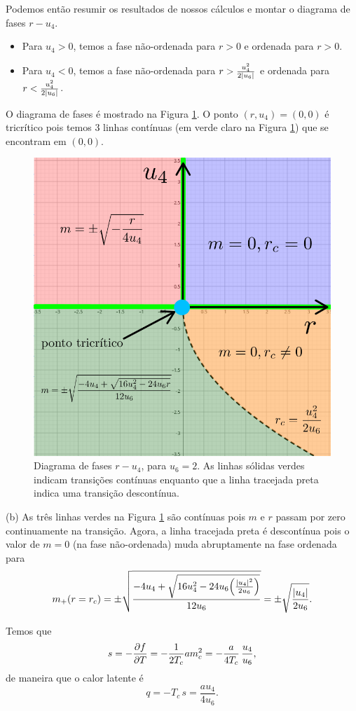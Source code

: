 \documentclass[a4paper,10pt]{article}
\begin{document}
\n

Podemos então resumir os resultados de nossos cálculos e montar o diagrama de fases $r-u_4$.
\begin{itemize}
\item Para $u_4 > 0$, temos a fase não-ordenada para $r > 0$ e ordenada para $r > 0$.
\item Para $u_4 < 0$, temos a fase não-ordenada para $r > \frac{u_4^2}{2 \abs{u_6}}$ e ordenada para $r < \frac{u_4^2}{2 \abs{u_6}}$.
\end{itemize}

O diagrama de fases é mostrado na Figura \ref{fig:phase_diag-tricrit}. O ponto $(r,u_4) = (0,0)$ é tricrítico pois temos 3 linhas contínuas (em verde claro na Figura \ref{fig:phase_diag-tricrit}) que se encontram em $(0,0)$.
\begin{figure}[H]
\centering
\includegraphics[width=0.49\linewidth]{fig/phase_diag-tricrit.png}
\caption{Diagrama de fases $r - u_4$, para $u_6 = 2$. As linhas sólidas verdes indicam transições contínuas enquanto que a linha tracejada preta indica uma transição descontínua.}
\label{fig:phase_diag-tricrit}
\end{figure}

(b) As três linhas verdes na Figura \ref{fig:phase_diag-tricrit} são contínuas pois $m$ e $r$ passam por zero continuamente na transição. Agora, a linha tracejada preta é descontínua pois o valor de $m = 0$ (na fase não-ordenada) muda abruptamente na fase ordenada para
$$
m_+(r = r_c) = \pm\sqrt{\frac{- 4 u_4 + \sqrt{16 u_4^2 - 24 u_6 \qty(\frac{\abs{u_4}^2}{2 u_6})}}{12 u_6}} = \pm\sqrt{\frac{\abs{u_4}}{2 u_6}}.
$$

\n

Temos que
$$
s = - \pdv{f}{T} = -\frac{1}{2 T_c} a m_c^2 = -\frac{a}{4 T_c} \, \frac{u_4}{u_6},
$$
de maneira que o calor latente é
$$
q = - T_c \, s = \frac{a u_4}{4 u_6}.
$$
\end{document}
